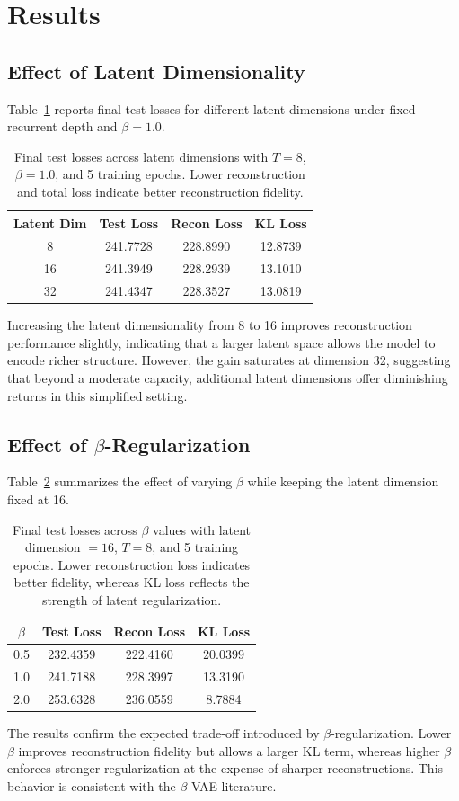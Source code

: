 \documentclass[11pt,a4paper]{article}
\begin{document}
\section{Results}
\subsection{Effect of Latent Dimensionality}
Table~\ref{tab:latent} reports final test losses for different latent dimensions under fixed recurrent depth and $\beta = 1.0$.
\begin{table}[H]
\centering
\caption{Final test losses across latent dimensions with $T = 8$, $\beta = 1.0$, and 5 training epochs. Lower reconstruction and total loss indicate better reconstruction fidelity.}
\label{tab:latent}
\begin{tabular}{cccc}
\toprule
Latent Dim & Test Loss & Recon Loss & KL Loss \\
\midrule
8  & 241.7728 & 228.8990 & 12.8739 \\
16 & 241.3949 & 228.2939 & 13.1010 \\
32 & 241.4347 & 228.3527 & 13.0819 \\
\bottomrule
\end{tabular}
\end{table}
Increasing the latent dimensionality from 8 to 16 improves reconstruction performance slightly, indicating that a larger latent space allows the model to encode richer structure. However, the gain saturates at dimension 32, suggesting that beyond a moderate capacity, additional latent dimensions offer diminishing returns in this simplified setting.
\subsection{Effect of $\beta$-Regularization}
Table~\ref{tab:beta} summarizes the effect of varying $\beta$ while keeping the latent dimension fixed at 16.
\begin{table}[H]
\centering
\caption{Final test losses across $\beta$ values with latent dimension $=16$, $T = 8$, and 5 training epochs. Lower reconstruction loss indicates better fidelity, whereas KL loss reflects the strength of latent regularization.}
\label{tab:beta}
\begin{tabular}{cccc}
\toprule
$\beta$ & Test Loss & Recon Loss & KL Loss \\
\midrule
0.5 & 232.4359 & 222.4160 & 20.0399 \\
1.0 & 241.7188 & 228.3997 & 13.3190 \\
2.0 & 253.6328 & 236.0559 & 8.7884 \\
\bottomrule
\end{tabular}
\end{table}
The results confirm the expected trade-off introduced by $\beta$-regularization. Lower $\beta$ improves reconstruction fidelity but allows a larger KL term, whereas higher $\beta$ enforces stronger regularization at the expense of sharper reconstructions. This behavior is consistent with the $\beta$-VAE literature.
\end{document}
